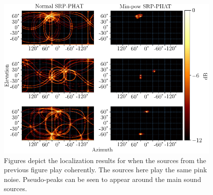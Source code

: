 \begin{figure}[H]
\centering
\includegraphics[width=\textwidth]{Figures/simCoherenceTrue.png}
\caption{Figures depict the localization results for when the sources from the previous figure play coherently. The sources here play the same pink noise. Pseudo-peaks can be seen to appear around the main sound sources.}
\label{fig:4mic1srcCoherence}
\end{figure}


